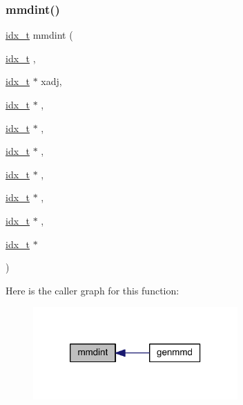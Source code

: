 \subsubsection{\texorpdfstring{mmdint()}{mmdint()}}
{\footnotesize\ttfamily \hyperlink{a00876_aaa5262be3e700770163401acb0150f52}{idx\+\_\+t} mmdint (\begin{DoxyParamCaption}\item[{\hyperlink{a00876_aaa5262be3e700770163401acb0150f52}{idx\+\_\+t}}]{,  }\item[{\hyperlink{a00876_aaa5262be3e700770163401acb0150f52}{idx\+\_\+t} $\ast$}]{xadj,  }\item[{\hyperlink{a00876_aaa5262be3e700770163401acb0150f52}{idx\+\_\+t} $\ast$}]{,  }\item[{\hyperlink{a00876_aaa5262be3e700770163401acb0150f52}{idx\+\_\+t} $\ast$}]{,  }\item[{\hyperlink{a00876_aaa5262be3e700770163401acb0150f52}{idx\+\_\+t} $\ast$}]{,  }\item[{\hyperlink{a00876_aaa5262be3e700770163401acb0150f52}{idx\+\_\+t} $\ast$}]{,  }\item[{\hyperlink{a00876_aaa5262be3e700770163401acb0150f52}{idx\+\_\+t} $\ast$}]{,  }\item[{\hyperlink{a00876_aaa5262be3e700770163401acb0150f52}{idx\+\_\+t} $\ast$}]{,  }\item[{\hyperlink{a00876_aaa5262be3e700770163401acb0150f52}{idx\+\_\+t} $\ast$}]{ }\end{DoxyParamCaption})}

Here is the caller graph for this function\+:\nopagebreak
\begin{figure}[H]
\begin{center}
\leavevmode
\includegraphics[width=222pt]{a00945_af988a4c32a3ad8671066948abf7c2582_icgraph}
\end{center}
\end{figure}
\mbox{\label{a00945_ae090e63169c49463225ff0c4704af93f}} 
